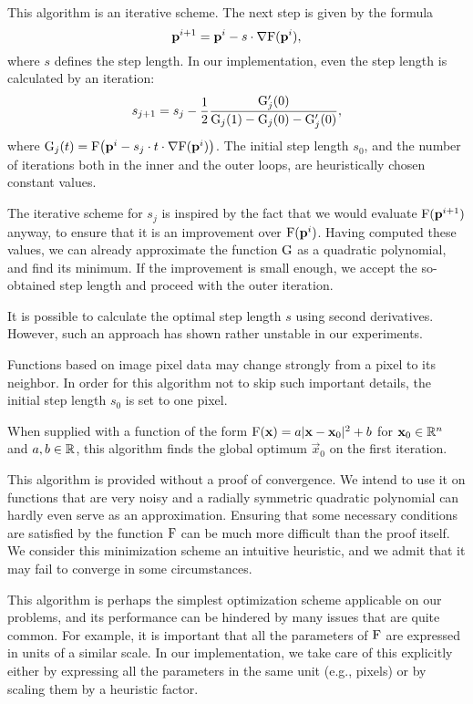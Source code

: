 This algorithm is an iterative scheme.
The next step is given by the formula
$$\mathbf{p}^{i+1} = \mathbf{p}^i - s \cdot \nabla \mathrm{F}(\mathbf{p}^i),$$
where $s$ defines the step length.
In our implementation, even the step length is calculated by an iteration:
$$s_{j+1} = s_j - \frac 1 2 \frac {\mathrm{G}_j'(0)} {\mathrm{G}_j(1) - \mathrm{G}_j(0) - \mathrm{G}_j'(0)},$$
where $\mathrm{G}_j(t) = \mathrm{F} \big( \mathbf{p}^i - s_j \cdot t \cdot \nabla \mathrm{F}(\mathbf{p}^i) \big)$.
The initial step length $s_0$, and the number of iterations both in the inner and the outer loops, are heuristically chosen constant values.

The iterative scheme for $s_j$ is inspired by the fact that we would evaluate $\mathrm{F}(\mathbf{p}^{i+1})$ anyway, to ensure that it is an improvement over $\mathrm{F}(\mathbf{p}^i)$.
Having computed these values, we can already approximate the function $\mathrm{G}$ as a quadratic polynomial, and find its minimum.
If the improvement is small enough, we accept the so-obtained step length and proceed with the outer iteration.

It is possible to calculate the optimal step length $s$ using second derivatives.
However, such an approach has shown rather unstable in our experiments.

Functions based on image pixel data may change strongly from a pixel to its neighbor.
In order for this algorithm not to skip such important details, the initial step length $s_0$ is set to one pixel.

\begin{claim}
When supplied with a function of the form $\mathrm{F}(\mathbf{x}) = a|\mathbf{x} - \mathbf{x}_0|^2 + b$ for $\mathbf{x}_0 \in \mathbb{R}^n$ and $a, b \in \mathbb{R}$, this algorithm finds the global optimum $\vec x_0$ on the first iteration.
\end{claim}
This algorithm is provided without a proof of convergence.
We intend to use it on functions that are very noisy and a radially symmetric quadratic polynomial can hardly even serve as an approximation.
Ensuring that some necessary conditions are satisfied by the function $\mathrm{F}$ can be much more difficult than the proof itself.
We consider this minimization scheme an intuitive heuristic, and we admit that it may fail to converge in some circumstances.

This algorithm is perhaps the simplest optimization scheme applicable on our problems, and its performance can be hindered by many issues that are quite common.
For example, it is important that all the parameters of $\mathrm{F}$ are expressed in units of a similar scale.
In our implementation, we take care of this explicitly either by expressing all the parameters in the same unit (e.g., pixels) or by scaling them by a heuristic factor.

